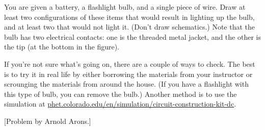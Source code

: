 You are given a battery, a flashlight bulb, and a single
piece of wire.  Draw at least two configurations of these
items that would result in lighting up the bulb, and at
least two that would not light it.  (Don't draw schematics.)
Note that the bulb has two
electrical contacts: one is the threaded metal jacket, and
the other is the tip (at the bottom in the figure).

If you're not sure what's going on, there are a couple of ways to
check. The best is to try it in real life by either
borrowing the materials
from your instructor or scrounging the materials from around the house. (If you have
a flashlight with this type of bulb, you can remove the bulb.) Another method
is to use the simulation at \url{phet.colorado.edu/en/simulation/circuit-construction-kit-dc}.

[Problem by Arnold Arons.]
